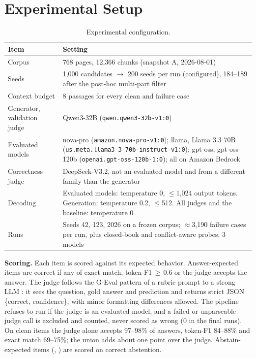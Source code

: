 \documentclass[conference]{IEEEtran}
\newcommand{\op}[1]{\texttt{\detokenize{#1}}}
\begin{document}
\section{Experimental Setup}
\begin{table}[t]
\centering
\caption{Experimental configuration.}
\label{tab:config}
\footnotesize
\begin{tabular}{@{}p{}p{}@{}}
\toprule
Item & Setting \\
\midrule
Corpus & 768 pages, 12,366 chunks (snapshot A, 2026-08-01) \\
Seeds & 1,000 candidates $\to$ 200 seeds per run (configured), 184--189 after the post-hoc multi-part filter \\
Context budget & 8 passages for every clean and failure case \\
Generator, validation judge & Qwen3-32B (\texttt{qwen.qwen3-32b-v1:0}) \\
Evaluated models & nova-pro (\texttt{amazon.nova-pro-v1:0}); llama, Llama 3.3 70B (\texttt{us.meta.llama3-3-70b-instruct-v1:0}); gpt-oss, gpt-oss-120b (\texttt{openai.gpt-oss-120b-1:0}); all on Amazon Bedrock \\
Correctness judge & DeepSeek-V3.2, not an evaluated model and from a different family than the generator \\
Decoding & Evaluated models: temperature 0, $\le$1,024 output tokens. Generation: temperature 0.2, $\le$512. All judges and the baseline: temperature 0 \\
Runs & Seeds 42, 123, 2026 on a frozen corpus; $\approx$3,190 failure cases per run, plus closed-book and conflict-aware probes; 3 models \\
\bottomrule
\end{tabular}
\end{table}

\textbf{Scoring.} Each item is scored against its expected behavior. Answer-expected items are
correct if any of exact match, token-F1\,$\ge$\,0.6 or the judge accepts the answer. The judge
follows the G-Eval pattern of a rubric prompt to a strong LLM \cite{liu2023geval}: it sees the
question, gold answer and prediction and returns strict JSON \{correct, confidence\}, with
minor formatting differences allowed. The pipeline refuses to run if the judge is an evaluated
model, and a failed or unparseable judge call is excluded and counted, never scored as wrong
(0 in the final runs). On clean items the judge alone accepts 97--98\% of answers, token-F1
84--88\% and exact match 69--75\%; the union adds about one point over the judge. Abstain-expected
items (\op{missing_evidence}, \op{hard_negative}) are scored on correct abstention.
\end{document}
